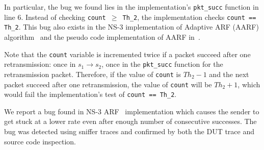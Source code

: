 In particular, the bug we found lies in the implementation's \texttt{pkt\_succ}
function in line 6. Instead of checking \texttt{count $\ge$ Th\_2}, the
implementation checks \texttt{count == Th\_2}. This bug also exists in the NS-3
implementation of Adaptive ARF (AARF) algorithm~\cite{lacage2004ieee} and the
pseudo code implementation of AARF in~\cite{lacage2004report}.

Note that the \texttt{count} variable is incremented twice if a packet succeed
after one retransmission: once in $s_1\rightarrow s_2$, once in the
\texttt{pkt\_succ} function for the retransmission packet. Therefore, if the
value of \texttt{count} is $Th_2-1$ and the next packet succeed after one
retransmission, the value of \texttt{count} will be $Th_2+1$, which would fail
the implementation's test of \texttt{count == Th\_2}.

We report a bug found in NS-3 ARF~\cite{kamerman1997wavelan} implementation
which causes the sender to get stuck at a lower rate even after enough number of
consecutive successes. The bug was detected using sniffer traces and
confirmed by both the DUT trace and source code inspection.
